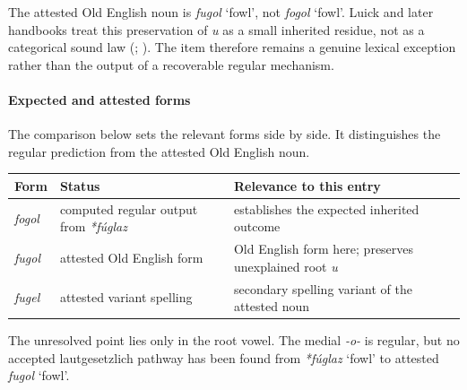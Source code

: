 \documentclass[
  british,
  a4paper,
]{article}
\newcounter{none} %
\providecommand{\Recon}[1]{\emph{*#1}}
\begin{document}
The attested Old English noun is \emph{fugol} `fowl', not \emph{fogol}
`fowl'. Luick and later handbooks treat this preservation of \emph{u} as
a small inherited residue, not as a categorical sound law
(;
). The item
therefore remains a genuine lexical exception rather than the output of
a recoverable regular mechanism.

\paragraph{Expected and attested
forms}\label{expected-and-attested-forms}

The comparison below sets the relevant forms side by side. It
distinguishes the regular prediction from the attested Old English noun.

{\def\LTcaptype{none} %
\begin{longtable}[]{@{}
  >{\raggedright\arraybackslash}p{}
  >{\raggedright\arraybackslash}p{}
  >{\raggedright\arraybackslash}p{}@{}}
\toprule\noalign{}
\begin{minipage}[b]{\linewidth}\raggedright
Form
\end{minipage} & \begin{minipage}[b]{\linewidth}\raggedright
Status
\end{minipage} & \begin{minipage}[b]{\linewidth}\raggedright
Relevance to this entry
\end{minipage} \\
\midrule\noalign{}
\endhead
\bottomrule\noalign{}
\endlastfoot
\emph{fogol} & computed regular output from \emph{*fúglaz} & establishes
the expected inherited outcome \\
\emph{fugol} & attested Old English form & Old English form here;
preserves unexplained root \emph{u} \\
\emph{fugel} & attested variant spelling & secondary spelling variant of
the attested noun \\
\end{longtable}
}

The unresolved point lies only in the root vowel. The medial \emph{-o-}
is regular, but no accepted lautgesetzlich pathway has been found from
\Recon{fúglaz} `fowl' to attested \emph{fugol} `fowl'.
\end{document}
